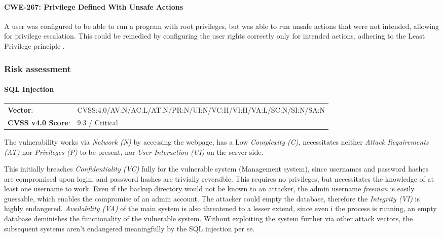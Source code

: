 \documentclass[../report.tex]{subfiles}
\begin{document}
\paragraph{CWE-267: Privilege Defined With Unsafe Actions}
A user was configured to be able to run a program with root privileges, but was able to run unsafe actions that were not intended, allowing for privilege escalation. This could be remedied by configuring the user rights correctly only for intended actions, adhering to the Least Privilege principle \autocite{mitre:cwe:272}.

\newpage

\subsubsection{Risk assessment}

\paragraph{SQL Injection}
\begin{tabular}{l l}
\textbf{Vector}: & CVSS:4.0/AV:N/AC:L/AT:N/PR:N/UI:N/VC:H/VI:H/VA:L/SC:N/SI:N/SA:N\\
\textbf{CVSS v4.0 Score}: & 9.3 / Critical\\
\end{tabular}

The vulnerability works via \textit{Network (N)} by accessing the webpage, has a Low \textit{Complexity (C)}, necessitates neither \textit{Attack Requirements (AT)} nor \textit{Privileges (P)} to be present, nor \textit{User Interaction (UI)} on the server side.

This initially breaches \textit{Confidentiality (VC)} fully for the vulnerable system (Management system), since usernames and password hashes are compromised upon login, and password hashes are trivially reversible. This requires no privileges, but necessitates the knowledge of at least one username to work.
Even if the backup directory would not be known to an attacker, the admin username \textit{freeman} is easily guessable, which enables the compromise of an admin account.
The attacker could empty the database, therefore the \textit{Integrity (VI)} is highly endangered. \textit{Availability (VA)} of the main system is also threatened to a lesser extend, since even i the process is running, an empty database deminishes the functionality of the vulnerable system. Without exploiting the system further via other attack vectors, the subsequent systems aren't endangered meaningfully by the SQL injection per se.
\end{document}
